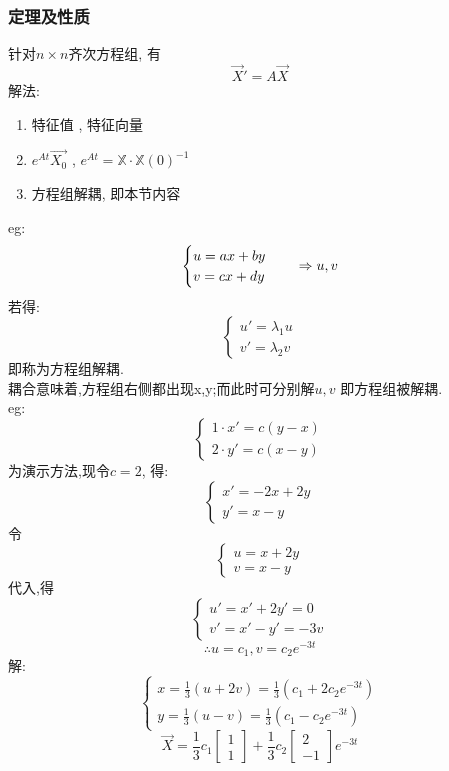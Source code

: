 \subsubsection{\large 定理及性质}
针对$n\times n$齐次方程组, 有
\[\vec{X}' = A \vec{X} \]
解法:
\begin{enumerate}
    \item 特征值 , 特征向量
    \item $e^{At}\vec{X_0}$ , $e^{At}=\mathbb{X} \cdot \mathbb{X}(0)^{-1}$
    \item 方程组解耦, 即本节内容
\end{enumerate}
eg:
\[
\begin{cases}
    u=ax + by \\
    v=cx + dy
\end{cases}
\hspace*{1em} \Rightarrow u,v
\]
若得:
\[
\begin{cases}
    u' = \lambda_1 u \\
    v' = \lambda_2 v
\end{cases}
\]
即称为方程组解耦.\\
耦合意味着,方程组右侧都出现x,y;而此时可分别解$u,v$ 即方程组被解耦.\\
eg:
\[
\begin{cases}
    1\cdot x' = c (y - x) \\
    2\cdot y' = c (x - y)
\end{cases}
\]
为演示方法,现令$c=2$, 得:
\[
\begin{cases}
    x' = -2x + 2y  \\
    y' = x - y
\end{cases}
\]
令
\[
\begin{cases}
    u = x + 2y \\
    v = x - y
\end{cases}
\]
代入,得
\[
\begin{cases}
    u' = x' + 2y' = 0\\
    v' = x' - y' = -3v
\end{cases}
\]
\[
\therefore u = c_1 , v = c_2 e^{-3t}
\]
解:
\[
\begin{cases}
    x = \frac{1}{3}(u + 2v) = \frac{1}{3}(c_1 + 2c_2 e^{-3t}) \\
    y = \frac{1}{3}(u - v) = \frac{1}{3}(c_1 - c_2 e^{-3t})
\end{cases}
\]
\[
\vec{X} = \frac{1}{3} c_1
\begin{bmatrix}
    1 \\
    1
\end{bmatrix} +
\frac{1}{3} c_2
\begin{bmatrix}
    2 \\
    -1
\end{bmatrix}
e^{-3t}
\]
